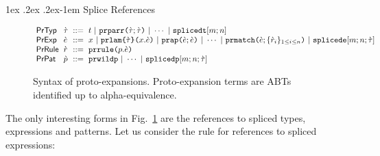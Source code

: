 \documentclass[acmsmall,screen]{acmart}
\makeatletter
\renewcommand{\paragraph}{%
  \@startsection{paragraph}{4}%
  {\z@}{1ex \@plus .2ex \@minus .2ex}{-1em}%
  {\normalfont\normalsize\bfseries}%
}
\makeatother
\begin{document}
\paragraph{Splice References} 
\begin{figure}
\begin{minipage}{\textwidth}
\small
$\arraycolsep=3pt\begin{array}{llcl}
\mathsf{PrTyp} & \ctau & ::= & t ~\vert~
\aceparr{\ctau}{\ctau} ~\vert~ \cdots ~\vert~
\acesplicedt{m}{n}\\
\mathsf{PrExp} & \ce & ::= & x ~\vert~
\acelam{\ctau}{x}{\ce} ~\vert~
\aceap{\ce}{\ce} ~\vert~
\cdots ~\vert~ 
\acematchwith{n}{\ce}{\seqschemaX{\crulev}} ~\vert~
\acesplicede{m}{n}{\ctau}\\
\mathsf{PrRule} & \crulev & ::= & \acematchrule{p}{\ce}\\
\mathsf{PrPat} & \cpv & ::= & \acewildp ~\vert~
\cdots ~\vert~
\acesplicedp{m}{n}{\ctau} 
\end{array}$
\end{minipage}
\caption[Syntax of proto-types and proto-expressions]{Syntax of proto-expansions. Proto-expansion terms are ABTs identified up to alpha-equivalence.}
\label{fig:U-candidate-terms}
\end{figure}
The only interesting forms in Fig.~\ref{fig:U-candidate-terms} are the references to spliced types, expressions and patterns. Let us consider the rule for references to spliced expressions:

{\small\begin{mathpar}
\end{mathpar}}
\end{document}
